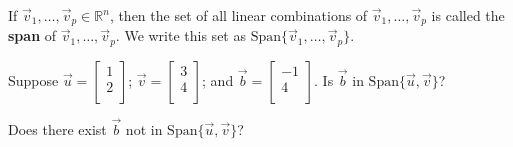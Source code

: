 \documentclass[12pt,letterpaper]{article}
\begin{document}
\begin{enumerate}
\begin{defn}
If $\vec{v}_1, \dots, \vec{v}_p \in \mathbb{R}^n$, then the set of all linear combinations of $\vec{v}_1, \dots, \vec{v}_p$ is called the {\bf span} of $\vec{v}_1, \dots, \vec{v}_p$. We write this set as $\text{Span} \{\vec{v}_1, \dots, \vec{v}_p\}$.
\end{defn}

\Problem 
\Part Suppose $\vec{u} =\begin{bmatrix} 1\\2\\ \end{bmatrix}$;  $\vec{v} =\begin{bmatrix} 3\\4\\ \end{bmatrix}$; and  $\vec{b} =\begin{bmatrix} -1\\4\\ \end{bmatrix}$. Is $\vec{b}$ in $\text{Span} \{ \vec{u}, \vec{v} \}$?

\vfill

\Part Does there exist $\vec{b}$ not in $\text{Span} \{ \vec{u}, \vec{v} \}$?

\vfill

\end{enumerate}


\newpage
{}%
\lhead{}
\rhead{}
\thispagestyle{fancy}
\end{document}
